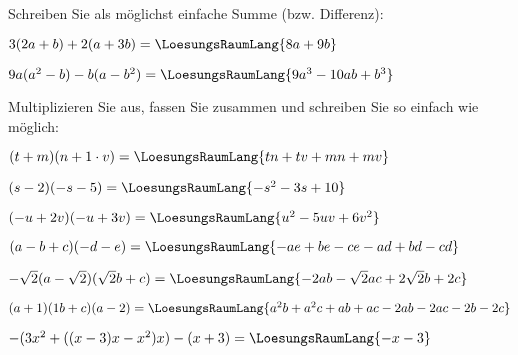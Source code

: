 Schreiben Sie als möglichst einfache Summe (bzw. Differenz):
\begin{bbwAufgabenBlock}
\item $3(2a+b) + 2(a+3b)=\LoesungsRaumLang{8a+9b}$
\item $9a(a^2-b)-b(a-b^2) = \LoesungsRaumLang{9a^3 - 10ab + b^3}$
\end{bbwAufgabenBlock}

Multiplizieren Sie aus, fassen Sie zusammen und schreiben Sie so
einfach wie möglich:
\begin{bbwAufgabenBlock}
\item $(t+m)(n+1\cdot{}v)=\LoesungsRaumLang{tn+tv+mn+mv}$
\item $(s-2)(-s-5) =\LoesungsRaumLang{-s^2-3s+10}$
\item $(-u+2v)(-u+3v) = \LoesungsRaumLang{u^2-5uv +6v^2}$
\item $(a-b+c)(-d-e)=\LoesungsRaumLang{-ae+be-ce-ad+bd-cd}$
\item $-\sqrt{2}(a-\sqrt{2})(\sqrt{2}b + c)
=\LoesungsRaumLang{-2ab- \sqrt{2}ac + 2\sqrt{2}b +2c}$
\item $(a+1)(1b+c)(a-2) = \LoesungsRaumLang{a^2b+a^2c+ab+ac-2ab-2ac-2b-2c}$
\item $-(3x^2+((x-3)x-x^2)x)-(x+3) = \LoesungsRaumLang{-x-3}$
\end{bbwAufgabenBlock} 

\platzFuerBerechnungenBisEndeSeite{}

\platzFuerBerechnungenBisEndeSeite{}



